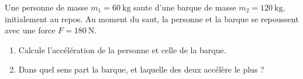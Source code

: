 \documentclass[11pt,a4paper]{article}
\begin{document}
\begin{exo}
Une personne de masse $m_1=\qty{60}{\kilogram}$ saute d'une barque de masse $m_2=\qty{120}{\kilogram}$,
initialement au repos. Au moment du saut, la personne et la barque se repoussent avec une force
$F=\qty{180}{\newton}$.
\begin{enumerate}[label=\alph*)]
  \item Calcule l'accélération de la personne et celle de la barque.
  \item Dans quel sens part la barque, et laquelle des deux accélère le plus ?
\end{enumerate}
\end{exo}
\end{document}
